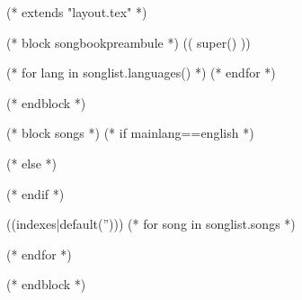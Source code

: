 (* extends "layout.tex" *)

(* block songbookpreambule *)
   (( super() ))

   (* for lang in songlist.languages() *)
   (* endfor *)
   \usepackage{babel}

   \graphicspath{{((datadir))/img/}}
(* endblock *)

(* block songs *)
   (* if mainlang==english *)
   (* else *)
   (* endif *)

   \begin{songs}{((indexes|default('')))}
      (* for song in songlist.songs *)
      
      (* endfor *)
   \end{songs}
(* endblock *)
